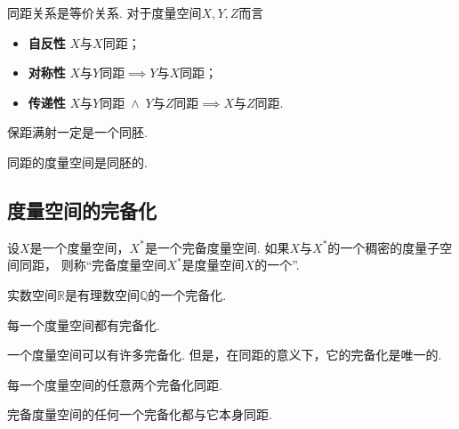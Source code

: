 \begin{proposition}
同距关系是等价关系.
对于度量空间\(X,Y,Z\)而言\begin{itemize}
	\item {\rm\bf 自反性} \(X\)与\(X\)同距；
	\item {\rm\bf 对称性} \(\text{$X$与$Y$同距} \implies \text{$Y$与$X$同距}\)；
	\item {\rm\bf 传递性} \(\text{$X$与$Y$同距} \;\land\; \text{$Y$与$Z$同距} \implies \text{$X$与$Z$同距}\).
\end{itemize}
\end{proposition}

\begin{proposition}
保距满射一定是一个同胚.
\end{proposition}

\begin{proposition}
同距的度量空间是同胚的.
\end{proposition}

\subsection{度量空间的完备化}
\begin{definition}
设\(X\)是一个度量空间，\(X^*\)是一个完备度量空间.
如果\(X\)与\(X^*\)的一个稠密的度量子空间同距，
则称“完备度量空间\(X^*\)是度量空间\(X\)的一个”.
\end{definition}

\begin{proposition}
实数空间\(\mathbb{R}\)是有理数空间\(\mathbb{Q}\)的一个完备化.
\end{proposition}

\begin{theorem}
每一个度量空间都有完备化.
\end{theorem}

一个度量空间可以有许多完备化.
但是，在同距的意义下，它的完备化是唯一的.

\begin{theorem}
每一个度量空间的任意两个完备化同距.
\end{theorem}

\begin{corollary}
完备度量空间的任何一个完备化都与它本身同距.
\end{corollary}
